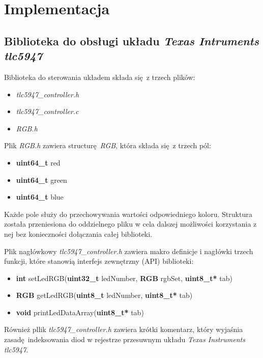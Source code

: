 \documentclass[eng,printmode]{mgr}
\begin{document}
\chapter{Implementacja}
\section{Biblioteka do obsługi układu \emph{Texas Intruments tlc5947}}

Biblioteka do sterowania układem składa się z trzech plików:

\begin{itemize}
  \item{\emph{tlc5947\_controller.h}}
  \item{\emph{tlc5947\_controller.c}}
  \item{\emph{RGB.h}}
\end{itemize}

Plik \emph{RGB.h} zawiera structurę \emph{RGB}, która składa się z trzech pól:

\begin{itemize}[before=\ttfamily]
  \item{\textbf{uint64\_t} red}
  \item{\textbf{uint64\_t} green}
  \item{\textbf{uint64\_t} blue}
\end{itemize}

Każde pole służy do przechowywania wartości odpowiedniego koloru. Struktura została przeniesiona do oddzielnego pliku w cela dalszej możliwości korzystania z nej bez konieczności dołączania całej biblioteki.

\vspace{0.3cm}

Plik nagłówkowy \emph{tlc5947\_controller.h} zawiera makro definicje i nagłówki trzech funkcji, które stanowią interfejs zewnętrzny (API) biblioteki:

\begin{itemize}[before=\ttfamily]
  \item{\textbf{int} setLedRGB(\textbf{uint32\_t} ledNumber, \textbf{RGB} rgbSet, \textbf{uint8\_t*} tab)}
  \item{\textbf{RGB} getLedRGB(\textbf{uint8\_t} ledNumber, \textbf{uint8\_t*} tab)}
  \item{\textbf{void} printLedDataArray(\textbf{uint8\_t*} tab)}
\end{itemize}

Również pllik \emph{tlc5947\_controller.h} zawiera krótki komentarz, który wyjaśnia zasadę indeksowania diod w rejestrze przesuwnym układu \emph{Texas Instruments tlc5947}. 
\end{document}
